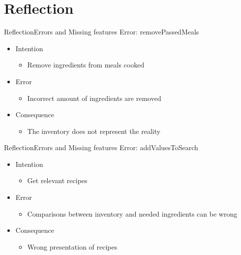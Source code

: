 \section{Reflection}

\begin{frame}{Reflection}{Errors and Missing features}%
	Error: removePassedMeals 
	\begin{itemize}
		\item Intention
			\begin{itemize}
			\item Remove ingredients from meals cooked
			\end{itemize}
		\item Error
			\begin{itemize}
			\item Incorrect amount of ingredients are removed
			\end{itemize}
		\item Consequence
			\begin{itemize}
			\item The inventory does not represent the reality
			\end{itemize}
	\end{itemize}
\end{frame}
\begin{frame}{Reflection}{Errors and Missing features}	
		Error: addValuesToSearch
		\begin{itemize}
			\item Intention
				\begin{itemize}
				\item Get relevant recipes
				\end{itemize}
			\item Error
				\begin{itemize}
				\item Comparisons between inventory and needed ingredients can be wrong 
				\end{itemize}
			\item Consequence
				\begin{itemize}
				\item Wrong presentation of recipes
				\end{itemize}
		\end{itemize}
\end{frame}

